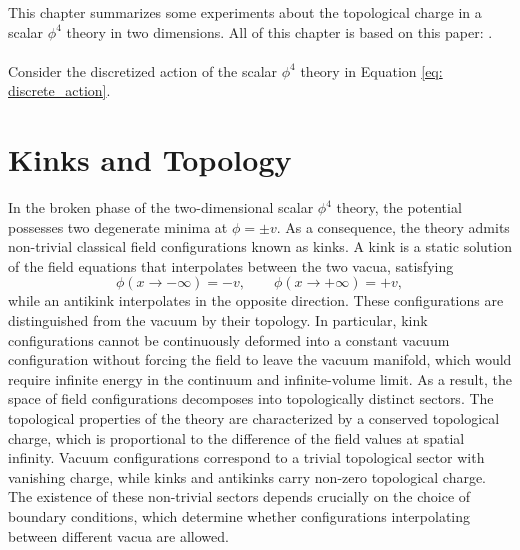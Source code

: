 This chapter summarizes some experiments about the topological charge in a scalar 
$\phi^4$ theory in two dimensions. All of this chapter is based on this paper: \cite{De_2005}. \\\\
Consider the discretized action of the scalar $\phi^4$ theory in Equation \ref{eq: discrete_action}. 
\section{Kinks and Topology}
In the broken phase of the two-dimensional scalar $\phi^4$ theory, the potential possesses two degenerate minima at $\phi = \pm v$. As a consequence, the theory admits non-trivial classical field configurations known as kinks. A kink is a static solution of the field equations that interpolates between the two vacua, satisfying
\[
\phi(x \to -\infty) = -v, \qquad \phi(x \to +\infty) = +v ,
\]
while an antikink interpolates in the opposite direction.
These configurations are distinguished from the vacuum by their topology. In particular, kink configurations cannot be continuously deformed into a constant vacuum configuration without forcing the field to leave the vacuum manifold, which would require infinite energy in the continuum and infinite-volume limit. As a result, the space of field configurations decomposes into topologically distinct sectors.
The topological properties of the theory are characterized by a conserved topological charge, which is proportional to the difference of the field values at spatial infinity. Vacuum configurations correspond to a trivial topological sector with vanishing charge, while kinks and antikinks carry non-zero topological charge. The existence of these non-trivial sectors depends crucially on the choice of boundary conditions, which determine whether configurations interpolating between different vacua are allowed. \cite{De_2005}
